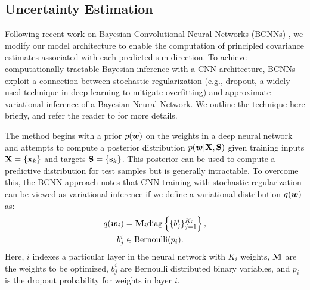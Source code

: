 \subsection{Uncertainty Estimation}
Following recent work on Bayesian Convolutional Neural Networks (BCNNs) \citep{Gal2016CNN,Gal2016-ny,Gal2016UncertaintyThesis}, we modify our model architecture to enable the computation of principled covariance estimates associated with each predicted sun direction. 
To achieve computationally tractable Bayesian inference with a CNN architecture, BCNNs exploit a connection between stochastic regularization (e.g., dropout, a widely used technique in deep learning to mitigate overfitting) and approximate variational inference of a Bayesian Neural Network.
We outline the technique here briefly, and refer the reader to \citet{Gal2016CNN} for more details. 

The method begins with a prior $p(\boldsymbol{w})$ on the weights in a deep neural network and attempts to compute a posterior distribution $p(\boldsymbol{w} | \boldsymbol{\mathbf{X}}, \boldsymbol{\mathbf{S}})$ given training inputs $\boldsymbol{\mathbf{X}} = \left\{\boldsymbol{\mathbf{x}}_k\right\}$ and targets $\boldsymbol{\mathbf{S}} = \left\{\boldsymbol{\mathbf{s}}_k\right\}$. This posterior can be used to compute a predictive distribution for test samples but is generally intractable. To overcome this, the BCNN approach notes that CNN training with stochastic regularization can be viewed as variational inference if we define a variational distribution $q(\boldsymbol{w})$ as:
\begin{align}
	q(\boldsymbol{w}_i) &= \boldsymbol{\mathbf{M}}_i \mathrm{diag} \left\{ \{b^i_j\}_{j=1}^{K_i} \right\}, \\
    b^i_j &\in \mathrm{Bernoulli}(p_i).
\end{align}
Here, $i$ indexes a particular layer in the neural network with $K_i$ weights, $\boldsymbol{\mathbf{M}}$ are the weights to be optimized, $b^i_j$ are Bernoulli distributed binary variables, and $p_i$ is the dropout probability for weights in layer $i$.

